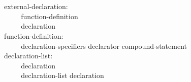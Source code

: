 \documentclass[12pt]{report}
\def\|{\verb|}
\begin{document}
\noindent
external-declaration:\\
\|    | function-definition\\
\|    | declaration\\

\noindent
function-definition:\\
\|    | declaration-specifiers declarator compound-statement\\

\noindent
declaration-list:\\
\|    | declaration\\
\|    | declaration-list declaration\\
\end{document}
